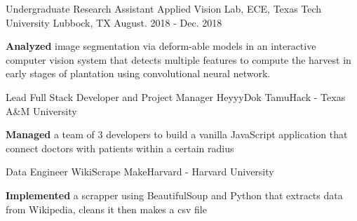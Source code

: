 
\begin{cventries}

  \cventry
    {Undergraduate Research Assistant} %
    {Applied Vision Lab, ECE, Texas Tech University} %
    {Lubbock, TX} %
    {August. 2018 - Dec. 2018} %
    {
      \begin{cvitems} %
        \item { \textbf{Analyzed} image segmentation via deform-able models in an interactive computer vision system that detects multiple features to compute the harvest in early stages of plantation using convolutional neural network.}
      \end{cvitems}
    }
    
  \cventry
    {Lead Full Stack Developer and Project Manager} %
    {HeyyyDok} %
    {TamuHack - Texas A\&M University} %
    {} %
    {
      \begin{cvitems} %
		\item { \textbf{Managed} a team of 3 developers to build a vanilla JavaScript application that connect doctors with patients within a certain radius }
      \end{cvitems}
    }
    
    \cventry
    {Data Engineer} %
    {WikiScrape} %
    {MakeHarvard - Harvard University}
    {} %
    { 
    \begin{cvitems} %
    \item { \textbf{Implemented} a scrapper using  BeautifulSoup and Python that extracts data from Wikipedia, cleans it then  makes a csv file }
    \end{cvitems} }
\end{cventries}
